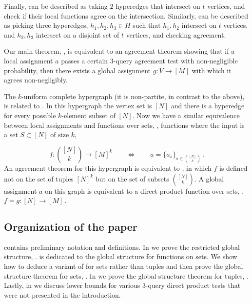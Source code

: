 \documentclass{toc}
\newcommand{\set}[1]{\{#1\}} %
\newcommand\f{f} %
\newcommand\pf{g} %
\begin{document}
Finally,  can be described as taking $2$ hyperedges that intersect on $t$ vertices, and check if their local functions agree on the intersection. Similarly,  can be described as picking three hyperedges, $h_1,h_2,h_3\in H$ such that $h_1,h_2$ intersect on $t$ vertices, and $h_2,h_3$ intersect on a disjoint set of $t$ vertices, and checking agreement.
	
Our main theorem, , is equivalent to an agreement theorem showing that if a local assignment $a$ passes a certain 3-query agreement test with non-negligible probability, then there exists a global assignment $\pf:V\rightarrow[M]$ with which it agrees non-negligibly.
	
The $k$-uniform complete hypergraph (it is non-partite, in contrast to the above), is related to . In this hypergraph the vertex set is $[N]$ and there is a hyperedge for every possible $k$-element subset of $[N]$. Now we have a similar equivalence between local assignments and functions over sets, \ie, functions where the input is a set $S\subset[N]$ of size $k$,
	
\[ f:\binom{[N]}k\to[M]^k \qquad \Longleftrightarrow \qquad a = \set{a_s}_{s\in\binom{[N]}k}\,. %
\]
%
An agreement theorem for this hypergraph is equivalent to , in which $\f$ is defined not on
%
%
%
%
%
the set of tuples $[N]^k$ but on the set of subsets $\binom {[N]} k$. %
A global assignment $a$ %
on this graph  %
%
is equivalent to a direct product function over sets, \ie, $\f=\pf:[N]\rightarrow[M]$\,.

\subsection{Organization of the paper}
 contains preliminary %
notation  %
and definitions. In  we prove the restricted global structure, .
 is dedicated to the global structure for functions on sets. We show how to deduce a variant of  for sets rather than tuples and then prove the global structure theorem for sets, . In  we prove the global structure theorem for tuples, .
Lastly, in  we discuss lower bounds for various 3-query direct product tests that were not presented in the introduction.
\end{document}
